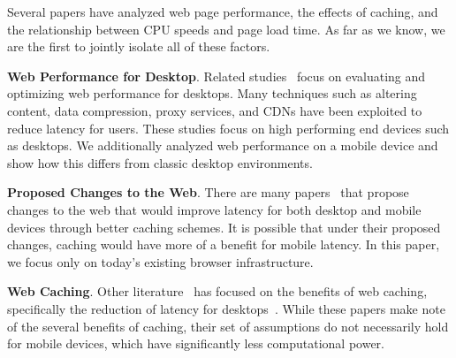 Several papers have analyzed web page performance, the effects of caching, and the relationship between CPU speeds and page load time.
As far as we know, we are the first to jointly isolate all of these factors. %

\textbf{Web Performance for Desktop}. Related studies~\cite{web-perf-2, web-perf-3} focus on evaluating and optimizing web performance for desktops. Many techniques such as altering content, data compression, proxy services, and CDNs have been exploited to reduce latency for users. These studies focus on high performing end devices such as desktops. We additionally analyzed web performance on a mobile device and show how this differs from classic desktop environments.

\textbf{Proposed Changes to the Web}. There are many papers~\cite{web-perf-4-new-design, web-caching-4-new-design, web-caching-5-new-design, web-caching-latency-1-new-design, web-caching-latency-2-new-design, web-caching-latency-3-new-design, web-caching-latency-5-new-design, web-caching-latency-6-new-design, web-caching-latency-7-new-design} that propose changes to the web that would improve latency for both desktop and mobile devices through better caching schemes. It is possible that under their proposed changes, caching would have more of a benefit for mobile latency. In this paper, we focus only on today's existing browser infrastructure. %

\textbf{Web Caching}. Other literature~\cite{web-caching-1, web-caching-2, web-caching-8, web-caching-9} has focused on the benefits of web caching, specifically the reduction of latency for desktops~\cite{web-caching-3, web-caching-4, web-caching-5, web-caching-6, web-caching-7}.
While these papers make note of the several benefits of caching, their set of assumptions do not necessarily hold for mobile devices, which have significantly less computational power. 

